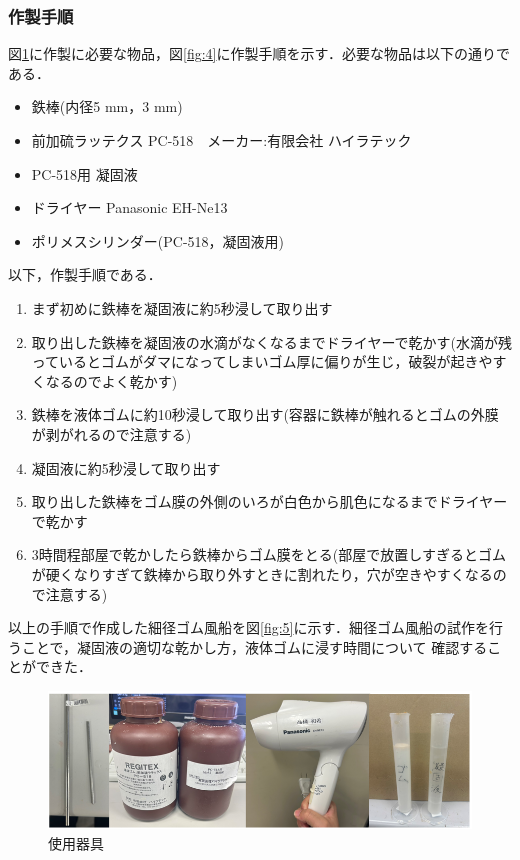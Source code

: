 \subsubsection{作製手順}
図\ref{fig:3}に作製に必要な物品，図\ref{fig:4}に作製手順を示す．必要な物品は以下の通りである．
\begin{itemize}
    \item 鉄棒(内径5 mm，3 mm)
    \item 前加硫ラッテクス PC-518　メーカー:有限会社 ハイラテック
    \item PC-518用 凝固液
    \item ドライヤー Panasonic EH-Ne13
    \item ポリメスシリンダー(PC-518，凝固液用)
  \end{itemize}
  以下，作製手順である．
\begin{enumerate}
    \item まず初めに鉄棒を凝固液に約5秒浸して取り出す
    \item 取り出した鉄棒を凝固液の水滴がなくなるまでドライヤーで乾かす(水滴が残っているとゴムがダマになってしまいゴム厚に偏りが生じ，破裂が起きやすくなるのでよく乾かす)
    \item 鉄棒を液体ゴムに約10秒浸して取り出す(容器に鉄棒が触れるとゴムの外膜が剥がれるので注意する)
    \item 凝固液に約5秒浸して取り出す
    \item 取り出した鉄棒をゴム膜の外側のいろが白色から肌色になるまでドライヤーで乾かす
    \item 3時間程部屋で乾かしたら鉄棒からゴム膜をとる(部屋で放置しすぎるとゴムが硬くなりすぎて鉄棒から取り外すときに割れたり，穴が空きやすくなるので注意する)
\end{enumerate}
以上の手順で作成した細径ゴム風船を図\ref{fig:5}に示す．細径ゴム風船の試作を行うことで，凝固液の適切な乾かし方，液体ゴムに浸す時間について
確認することができた．
\begin{figure}[!h]
  \centering  %
  \includegraphics[scale=0.5]{pic/kigu.PNG}
  \caption{使用器具}
  \label{fig:3}
\end{figure}
